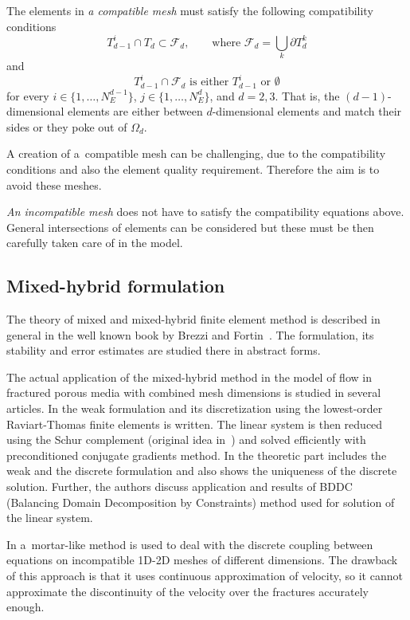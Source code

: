 \documentclass[dvipsnames,FM,Dis]{tulthesis}
\begin{document}
The elements in \emph{a compatible mesh} must satisfy the following compatibility conditions
\begin{equation}
        T_{d-1}^i \cap T_d \subset \mathcal{F}_d,   \qquad \text{where } \mathcal{F}_d = \bigcup_{k} \partial T_{d}^{k}
\end{equation}
and
\begin{equation}
        T_{d-1}^i \cap \mathcal{F}_d    \text{ is either $T_{d-1}^i$ or $\emptyset$}    
\end{equation}
for every $i\in\{1,\dots, N_{E}^{d-1}\}$, $j\in\{1,\dots,N_{E}^{d}\}$,  and $d=2,3$. 
That is, the $(d-1)$-dimensional elements are either between $d$-dimensional elements and
match their sides or they poke out of $\Omega_d$. 

A creation of a~compatible mesh can be challenging, due to the compatibility conditions and also the
element quality requirement. Therefore the aim is to avoid these meshes.

\emph{An incompatible mesh} does not have to satisfy the compatibility equations above. 
General intersections of elements can be considered but these must be then carefully taken care of in the model.


\subsection{Mixed-hybrid formulation}
The theory of mixed and mixed-hybrid finite element method is described in general in the well known book by 
Brezzi and Fortin~\cite{brezzi_mixed_1991}. 
The formulation, its stability and error estimates are studied there in abstract forms.

The actual application of the mixed-hybrid method in the model of flow in fractured porous 
media with combined mesh dimensions is studied in several articles.
In \cite{brezina_mixed-hybrid_2010} the weak formulation and its discretization using the lowest-order Raviart-Thomas finite 
elements is written. The linear system is then reduced using the Schur complement (original idea in~\cite{maryska_mixed-hybrid_1995})
and solved efficiently with preconditioned conjugate gradients method.
In \cite{sistek_bddc_2015} the theoretic part includes the weak and the discrete formulation and also shows
the uniqueness of the discrete solution. Further, the authors discuss application and results of BDDC 
(Balancing Domain Decomposition by Constraints) method used for solution of the linear system.

In \cite{brezina_2012} a~mortar-like method is used to deal with the discrete coupling between equations on incompatible 1D-2D meshes 
of different dimensions. The drawback of this approach is that it uses continuous approximation of velocity, so
it cannot approximate the discontinuity of the velocity over the fractures accurately enough.
\end{document}
